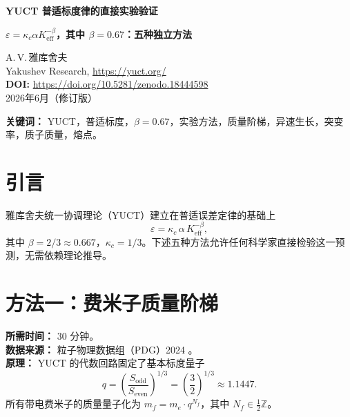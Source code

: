 \documentclass[12pt,a4paper]{article}
\newcommand{\Ke}{K_{\mathrm{eff}}}
\newcommand{\Sodd}{S_{\mathrm{odd}}}
\newcommand{\Seven}{S_{\mathrm{even}}}
\begin{document}
	
	\begin{center}
		{\Large \textbf{YUCT 普适标度律的直接实验验证}}
	\end{center}
	\begin{center}
		{\Large \textbf{\(\varepsilon = \kappa_c \alpha \Ke^{-\beta}\)，其中 \(\beta = 0.67\)：五种独立方法}}
	\end{center}
	
	\vspace{0.5cm}
	\noindent
	A.\,V.\,雅库舍夫\\
	Yakushev Research, \url{https://yuct.org/}\\
	\vspace{0.3cm}
	\textbf{DOI:} \url{https://doi.org/10.5281/zenodo.18444598}\\
	\noindent
	2026年6月（修订版）
	
	\vspace{0.5cm}
	
	\begin{abstract}
		\noindent
		本文介绍了五种独立的、经数值验证的实验方法，可直接证实雅库舍夫统一协调理论（YUCT）的核心预测：普适误差标度指数为 \(\beta = 0.67\)。
		每种方法均使用公开数据，仅需计算器，本科生可在一下午内复现。这些测试涵盖了粒子物理、生物学、进化遗传学和材料科学。
	\end{abstract}
	
	\vspace{0.5cm}
	
	\noindent
	\textbf{关键词：} YUCT，普适标度，\(\beta = 0.67\)，实验方法，质量阶梯，异速生长，突变率，质子质量，熔点。
	
	\section{引言}
	
	雅库舍夫统一协调理论（YUCT）建立在普适误差定律的基础上
	\begin{equation}\label{eq:error-law}
		\varepsilon = \kappa_c \, \alpha \, \Ke^{-\beta},
	\end{equation}
	其中 \(\beta = 2/3 \approx 0.667\)，\(\kappa_c = 1/3\)。下述五种方法允许任何科学家直接检验这一预测，无需依赖理论推导。
	
	\section{方法一：费米子质量阶梯}
	\label{sec:massladder}
	
	\textbf{所需时间：} 30 分钟。\\
	\textbf{数据来源：} 粒子物理数据组（PDG）2024 \cite{PDG2024}。\\
	\textbf{原理：} YUCT 的代数回路固定了基本标度量子
	\[
	q = \left( \frac{\Sodd}{\Seven} \right)^{1/3} = \left( \frac{3}{2} \right)^{1/3} \approx 1.1447.
	\]
	所有带电费米子的质量量子化为 \(m_f = m_e \cdot q^{N_f}\)，其中 \(N_f \in \frac{1}{2}\mathbb{Z}\)。
	
\end{document}
